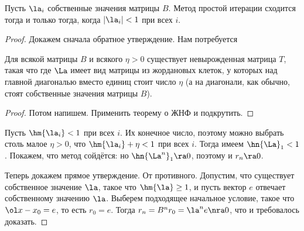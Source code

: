 \documentclass[a4paper]{article}
\begin{document}
\begin{theorem}
Пусть $\la_i$ собственные значения матрицы $B$. Метод простой итерации
сходится тогда и только тогда, когда $|\la_i|<1$ при всех $i$.
\end{theorem}
\begin{proof}
Докажем сначала обратное утверждение. Нам потребуется

\begin{lemma}
Для всякой матрицы $B$ и всякого $\eta > 0$ существует невырожденная
матрица $T$, такая что  где $\La$ имеет вид
матрицы из жордановых клеток, у которых над главной диагональю вместо
единиц стоит число $\eta$ (а на диагонали, как обычно, стоят
собственные значения матрицы $B$).
\end{lemma}
\begin{proof}
Потом напишем. Применить теорему о ЖНФ и подкрутить.
\end{proof}

Пусть $\hm{\la_i} < 1$ при всех $i$. Их конечное число, поэтому можно
выбрать столь малое $\eta > 0$, что $\hm{\la_i} + \eta < 1$ при всех
$i$. Тогда имеем $\hn{\La}_1 < 1$.  Покажем, что метод сойдётся:
 но
$\hn{\La^n}_1 \ra 0$, поэтому и $r_n \ra 0$.

Теперь докажем прямое утверждение. От противного. Допустим, что
существует собственное значение $\la$, такое что $\hm{\la} \ge 1$, и
пусть вектор $e$ отвечает собственному значению $\la$.  Выберем
подходящее начальное условие, такое что $\ol x - x_0 = e$, то есть
$r_0 = e$. Тогда $r_n = B^n r_0 = \la^n e \nra 0$, что и требовалось
доказать.
\end{proof}
\end{document}
